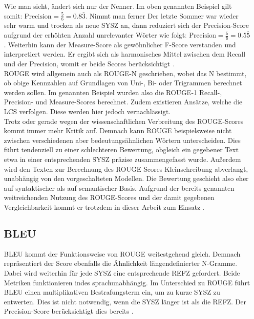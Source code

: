\noindent
Wie man sieht, ändert sich nur der Nenner. Im oben genannten Beispiel gilt somit: $\text{Precision} = \frac{5}{6} = 0.8\overline{3}$. Nimmt man ferner \glqq Der letzte Sommer war wieder sehr warm und trocken\grqq{} als neue \ac{SYSZ} an, dann reduziert sich der Precision-Score aufgrund der erhöhten Anzahl unrelevanter Wörter wie folgt: $\text{Precision} = \frac{5}{9} = 0.5\overline{5}$. Weiterhin kann der Measure-Score als gewöhnlicher F-Score verstanden und interpretiert werden. Er ergibt sich als harmonisches Mittel zwischen dem Recall und der Precision, womit er beide Scores berücksichtigt \cite[S.~1-3]{LIN04}.\\

\noindent
\ac{ROUGE} wird allgemein auch als \ac{ROUGE}-N geschrieben, wobei das N bestimmt, ob obige Kennzahlen auf Grundlagen von Uni-, Bi- oder Trigrammen berechnet werden sollen. Im genannten Beispiel wurden also die \ac{ROUGE}-1 Recall-, Precision- und Measure-Scores berechnet. Zudem existieren Ansätze, welche die \ac{LCS} verfolgen. Diese werden hier jedoch vernachlässigt.\\

\noindent
Trotz oder gerade wegen der wissenschaftlichen Verbreitung des \ac{ROUGE}-Scores kommt immer mehr Kritik auf. Demnach kann \ac{ROUGE} beispielsweise nicht zwischen verschiedenen aber bedeutungsähnlichen Wörtern unterscheiden. Dies führt tendenziell zu einer schlechteren Bewertung, obgleich ein gegebener Text etwa in einer entsprechenden \ac{SYSZ} präzise zusammengefasst wurde. Außerdem wird den Texten zur Berechnung des \ac{ROUGE}-Scores Kleinschreibung abverlangt, unabhängig von den vorgeschalteten Modellen. Die Bewertung geschieht also eher auf syntaktischer als auf semantischer Basis. Aufgrund der bereits genannten weitreichenden Nutzung des \ac{ROUGE}-Scores und der damit gegebenen Vergleichbarkeit kommt er trotzdem in dieser Arbeit zum Einsatz \cite[S.~5]{LIN04}.
\newpage

	
\subsection{BLEU}
\noindent
\ac{BLEU} kommt der Funktionsweise von \ac{ROUGE} weitestgehend gleich. Demnach repräsentiert der Score ebenfalls die Ähnlichkeit längendefinierter N-Gramme. Dabei wird weiterhin für jede \ac{SYSZ} eine entsprechende \ac{REFZ} gefordert. Beide Metriken funktionieren indes sprachunabhängig. Im Unterschied zu \ac{ROUGE} führt \ac{BLEU} einen multiplikativen Bestrafungsterm ein, um zu kurze \ac{SYSZ} zu entwerten. Dies ist nicht notwendig, wenn die \ac{SYSZ} länger ist als die \ac{REFZ}. Der Precision-Score berücksichtigt dies bereits \cite[S.~5]{PAP02}.\\

